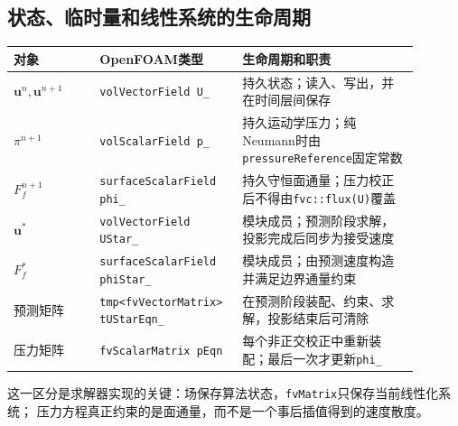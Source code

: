 \documentclass[UTF8,12pt,a4paper]{ctexart}
\numberwithin{equation}{section}
\begin{document}
\subsection{状态、临时量和线性系统的生命周期}
\begin{longtable}{p{0.20\linewidth}p{0.28\linewidth}p{0.41\linewidth}}
\toprule
对象 & OpenFOAM类型 & 生命周期和职责\\
\midrule
$\bm u^n,\bm u^{n+1}$ & \texttt{volVectorField U\_} & 持久状态；读入、写出，并在时间层间保存\\
$\pi^{n+1}$ & \texttt{volScalarField p\_} & 持久运动学压力；纯Neumann时由\texttt{pressureReference}固定常数\\
$F_f^{n+1}$ & \texttt{surfaceScalarField phi\_} & 持久守恒面通量；压力校正后不得由\texttt{fvc::flux(U)}覆盖\\
$\bm u^*$ & \texttt{volVectorField UStar\_} & 模块成员；预测阶段求解，投影完成后同步为接受速度\\
$F_f^*$ & \texttt{surfaceScalarField phiStar\_} & 模块成员；由预测速度构造并满足边界通量约束\\
预测矩阵 & \texttt{tmp<fvVectorMatrix> tUStarEqn\_} & 在预测阶段装配、约束、求解，投影结束后可清除\\
压力矩阵 & \texttt{fvScalarMatrix pEqn} & 每个非正交校正中重新装配；最后一次才更新\texttt{phi\_}\\
\bottomrule
\end{longtable}
这一区分是求解器实现的关键：场保存算法状态，\texttt{fvMatrix}只保存当前线性化系统；
压力方程真正约束的是面通量，而不是一个事后插值得到的速度散度。
\end{document}
